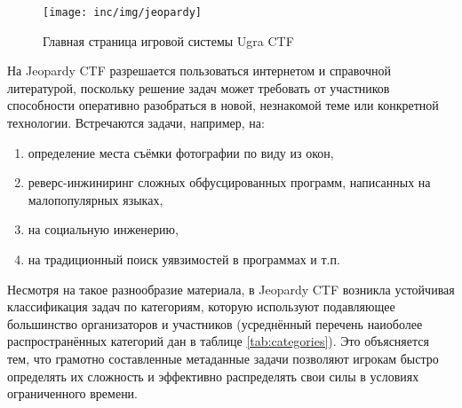 
\begin{figure}
  \centering
  \texttt{[image: inc/img/jeopardy]}
  \caption{Главная страница игровой системы Ugra CTF}
  \label{fig:jeopardy}
\end{figure}

На Jeopardy CTF разрешается пользоваться интернетом и справочной литературой, поскольку решение задач может требовать от участников способности оперативно разобраться в новой, незнакомой теме или конкретной технологии. Встречаются задачи, например, на:
\begin{enumerate}
\item определение места съёмки фотографии по виду из окон\cite{BigcitylightsTask},
\item реверс-инжиниринг сложных обфусцированных программ, написанных на малопопулярных языках\cite{ReverseTask},
\item на социальную инженерию\cite{SocialTask},
\item на традиционный поиск уявзимостей в программах\cite{WebTask} и т.п.
\end{enumerate}

Несмотря на такое разнообразие материала, в Jeopardy CTF возникла устойчивая классификация задач по категориям, которую используют подавляющее большинство организаторов и участников (усреднённый перечень наиоболее распространённых категорий дан в таблице \ref{tab:categories}). Это объясняется тем, что грамотно составленные метаданные задачи позволяют игрокам быстро определять их сложность и эффективно распределять свои силы в условиях ограниченного времени.

